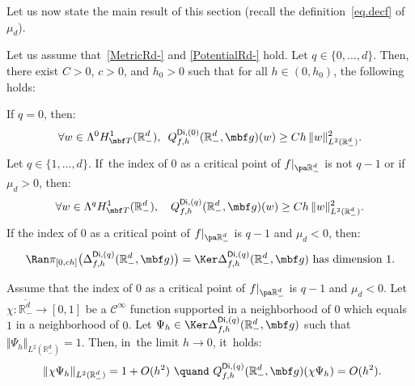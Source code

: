 Let us now state the main result of this section (recall the
definition~\eqref{eq.decf} of $\mu_d$).

\begin{proposition}\label{pr.prop-loca1-case1}
Let us assume that~\ref{MetricRd-} and \ref{PotentialRd-}
hold. Let $q\in \{0,\ldots,d\}$. Then, there exist $C>0$, $c>0$,
and $h_0>0$ such that for all $h\in (0,h_0)$, the following holds:
\begin{enumeratei}
\item\label{pr.prop-loca1-case1i}
If $q=0$, then:
\begin{equation}\label{eq.last1-case1}
\forall w\in \Lambda^0 H^1_{\mbf T}(\mathbb R^d_-), \ \, Q_{f,h}^{\mathsf{Di},(0)}(\mathbb R^d_-,\mbf g)(w)\ge Ch\, \Vert w \Vert_{L^2(\mathbb R^d_-)}^2.
\end{equation}
Let $q\in \{1,\ldots,d\}$. If~the index of $0$ as a critical point of
$f|_{\pa \mathbb R^d_-}$ is not $q-1$ or if $\mu_{d}>0$, then:
\begin{equation}\label{eq.last2-case1}
\forall w\in \Lambda^q H^1_{\mbf T}(\mathbb R^d_-), \quad Q_{f,h}^{\mathsf{Di},(q)}(\mathbb R^d_-,\mbf g)(w)\ge Ch\, \Vert w \Vert_{L^2(\mathbb R^d_-)}^2.
\end{equation}
If the index of $0$ as a critical point of $f|_{\pa \mathbb R^d_-}$
is $q-1$ and $\mu_{d}<0$, then:
\begin{equation}\label{eq.last3-case1}
\Ran \pi_{[0,ch]}\bigl(\Delta_{f,h}^{\mathsf{Di},(q)}(\mathbb R_-^d,\mbf g)\bigr)=\Ker \Delta_{f,h}^{\mathsf{Di},(q)}(\mathbb R_-^d,\mbf g) \text{ has dimension } 1.
\end{equation}
\item\label{pr.prop-loca1-case1ii}
Assume that the index of $0$ as a critical point of $f|_{\pa \mathbb R^d_-}$
is $q-1$ and $\mu_{d}<0$. Let $\chi: \overline{\mathbb R^{d}_-}\to [0,1]$ be a $\mathcal C^\infty$ function supported in a neighborhood of $0$ which equals~$1$ in a neighborhood of $0$.
Let $\Psi_h\in \Ker \Delta_{f,h}^{\mathsf{Di},(q)}(\mathbb R_-^d,\mbf g)$ such that $ \Vert \Psi_h \Vert_{L^2(\mathbb R^d_-)}=1$. Then,
in~the limit $h\to 0$, it~holds:
\begin{equation}\label{eq.norme-case1}
\ \Vert \chi \Psi_h \Vert_{L^2(\mathbb R^d_-)} =1+O (h^{2}) \ \quand \ Q_{f,h}^{\mathsf{Di},(q)}(\mathbb R^d_-,\mbf g)(\chi \Psi_h)=O(h^{2}).
\end{equation}
\end{enumeratei}
\end{proposition}

